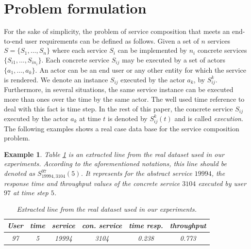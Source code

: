 \documentclass[10pt,journal,compsoc]{IEEEtran}
\newtheorem{example}{Example}
\newcommand{\red}[1]{\textcolor{red}{#1}}
\begin{document}

\section{Problem formulation} \label{sec:problem-formulation}

For the sake of simplicity, the problem of service composition that meets an end-to-end user requirements can be defined as follows. Given a set of $n$ services $S=\{S_1,\dots, S_n\}$ where each service $S_i$ can be implemented by $n_i$ concrete services $\{ S_{i1}, \dots, S_{in_i}\}$. Each concrete service $S_{ij}$ may be executed by a set of actors $\{a_1, \dots, a_k\}$. An actor can be an end user or any other entity for which the service is rendered. We denote an instance $S_{ij}$ executed by the actor $a_k$, by $S_{ij}^k$. Furthermore, in several situations, the same service instance can be executed more than ones over the time by the same actor. The well used time reference to deal with this fact is time step. In the rest of this paper, the concrete service $S_{ij}$ executed by the actor $a_k$ at time $t$ is denoted by $S_{ij}^k(t)$ and is called \textit{execution}. The following examples shows a real case data base for the service composition problem. 

\begin{example} Table \ref{table:realdb:exmpl} is an extracted line from the real dataset \cite{Zheng2014,Zheng2015} used in our experiments. According to the aforementioned notations, this line should be denoted as $S_{19994,3104}^{97}(5)$. It represents for the abstract service $19994$, the response time and throughput values of the concrete service $3104$ executed by user $97$ at time step $5$.	

\begin{table}[htp]
\caption{Extracted line from the real dataset \cite{Zheng2014,Zheng2015} used in our experiments.}
\begin{center}
\begin{tabular}{|c|c|c|c|c|c|}
\hline
User&time&service&con. service& time resp.& throughput  \\
\hline
97& 5& 19994& 3104&0.238&0.773\\
\hline
\end{tabular}
\end{center}
\label{table:realdb:exmpl}
\end{table}%
\label{example:DB}
\end{example}
\end{document}
